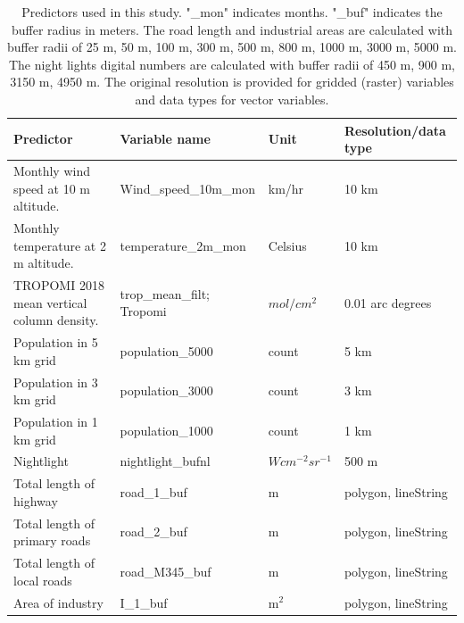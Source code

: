 \documentclass{article}
\begin{document}
 
\begin{table}[h] 
\centering
\caption{Predictors used in this study. "\_mon" indicates months.  "\_buf" indicates the buffer radius in meters. The road length and industrial areas are calculated with buffer radii of 25 m, 50 m, 100 m, 300 m, 500 m, 800 m, 1000 m, 3000 m, 5000 m. The night lights digital numbers are calculated with buffer radii of 450 m, 900 m, 3150 m, 4950 m. The original resolution is provided for gridded (raster) variables and data types for vector variables.}

\label{tab:prevar}
{
\begin{tabular}{p{4cm}|l|l|l}
\hline
Predictor                                    & Variable name                & Unit         & Resolution/data type         \\ \hline
Monthly wind speed at 10 m altitude. &  Wind\_speed\_10m\_mon   & km/hr         &    10 km \\ \hline
Monthly temperature at 2 m altitude.  & temperature\_2m\_mon  &  Celsius        &    10 km \\ \hline
 
TROPOMI 2018 mean vertical column density.  & trop\_mean\_filt; Tropomi&  $mol /cm^2$ &   0.01 arc degrees  \\ \hline

Population in 5 km grid  & population\_5000 & count  & 5 km \\ \hline
Population in 3 km grid & population\_3000 & count  & 3 km \\ \hline
Population in 1 km grid  & population\_1000 & count  & 1 km\\ \hline
Nightlight  & nightlight\_bufnl & $W cm^{-2} sr^{-1}$  & 500 m\\ \hline
Total length of highway  & road\_1\_buf  & m &polygon, lineString              \\\hline
Total length of primary roads                   & road\_2\_buf          & m  &polygon, lineString            \\\hline
Total length of local roads     & road\_M345\_buf        & m  &polygon, lineString               \\\hline
Area of industry                                    & I\_1\_buf           & m$^2$ &polygon, lineString            \\\hline
 

\end{tabular}
}  
\end{table}
\end{document}
